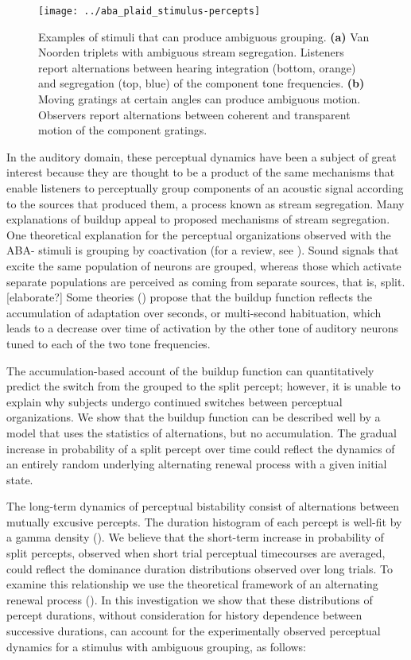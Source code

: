 \begin{figure}
	\centering
	\texttt{[image: ../aba\_plaid\_stimulus-percepts]}
	\caption{Examples of stimuli that can produce ambiguous grouping. \textbf{(a)} Van Noorden triplets with ambiguous stream segregation. Listeners report alternations between hearing integration (bottom, orange) and segregation (top, blue) of the component tone frequencies. \textbf{(b)} Moving gratings at certain angles can produce ambiguous motion. Observers report alternations between coherent and transparent motion of the component gratings.}
	\label{fig:percepts_timecourse}
\end{figure}

In the auditory domain, these perceptual dynamics have been a subject of great interest because they are thought to be a product of the same mechanisms that enable listeners to perceptually group components of an acoustic signal according to the sources that produced them, a process known as stream segregation. Many explanations of buildup appeal to proposed mechanisms of stream segregation. One theoretical explanation for the perceptual organizations observed with the ABA- stimuli is grouping by coactivation (for a review, see \cite{Carlyon2004}). Sound signals that excite the same population of neurons are grouped, whereas those which activate separate populations are perceived as coming from separate sources, that is, split. [elaborate?] Some theories (\cite{Micheyl2005,Pressnitzer2008,Bee2010}) propose that the buildup function reflects the accumulation of adaptation over seconds, or multi-second habituation, which leads to a decrease over time of activation by the other tone of auditory neurons tuned to each of the two tone frequencies.  %

The accumulation-based account of the buildup function can quantitatively predict the switch from the grouped to the split percept; however, it is unable to explain why subjects undergo continued switches between perceptual organizations. We show that the buildup function can be described well by a model that uses the statistics of alternations, but no accumulation. The gradual increase in probability of a split percept over time could reflect the dynamics of an entirely random underlying alternating renewal process with a given initial state.

The long-term dynamics of perceptual bistability consist of alternations between mutually excusive percepts. The duration histogram of each percept is well-fit by a gamma density (\cite{Shpiro2009, Pressnitzer2006}). We believe that the short-term increase in probability of split percepts, observed when short trial perceptual timecourses are averaged, could reflect the dominance duration distributions observed over long trials. To examine this relationship we use the theoretical framework of an alternating renewal process (\cite{}). In this investigation we show that these distributions of percept durations, without consideration for history dependence between successive durations, can account for the experimentally observed perceptual dynamics for a stimulus with ambiguous grouping, as follows:

